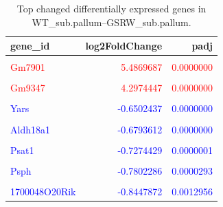 \documentclass[
  letterpaper,
  DIV=11,
  numbers=noendperiod]{scrartcl}
\begin{document}
\hypertarget{tbl-comparison_2}{}
\begin{table}
\caption{\label{tbl-comparison_2}Top changed differentially expressed genes in
WT\_sub.pallum--GSRW\_sub.pallum. }\tabularnewline

\centering\begingroup\fontsize{8}{10}\selectfont

\begin{tabular}[t]{lrr}
\toprule
gene\_id & log2FoldChange & padj\\
\midrule
\textcolor{red}{\cellcolor{gray!6}{AC135641.1}} & \textcolor{red}{\cellcolor{gray!6}{5.9024901}} & \textcolor{red}{\cellcolor{gray!6}{0.0300606}}\\
\textcolor{red}{Gm7901} & \textcolor{red}{5.4869687} & \textcolor{red}{0.0000000}\\
\textcolor{red}{\cellcolor{gray!6}{C030018K13Rik}} & \textcolor{red}{\cellcolor{gray!6}{5.1745342}} & \textcolor{red}{\cellcolor{gray!6}{0.0371569}}\\
\textcolor{red}{Gm9347} & \textcolor{red}{4.2974447} & \textcolor{red}{0.0000000}\\
\textcolor{red}{\cellcolor{gray!6}{Cxcl14}} & \textcolor{red}{\cellcolor{gray!6}{0.7804630}} & \textcolor{red}{\cellcolor{gray!6}{0.0352495}}\\
\addlinespace
\textcolor{blue}{Yars} & \textcolor{blue}{-0.6502437} & \textcolor{blue}{0.0000000}\\
\textcolor{blue}{\cellcolor{gray!6}{Mars}} & \textcolor{blue}{\cellcolor{gray!6}{-0.6584464}} & \textcolor{blue}{\cellcolor{gray!6}{0.0000000}}\\
\textcolor{blue}{Aldh18a1} & \textcolor{blue}{-0.6793612} & \textcolor{blue}{0.0000000}\\
\textcolor{blue}{\cellcolor{gray!6}{Phgdh}} & \textcolor{blue}{\cellcolor{gray!6}{-0.6999350}} & \textcolor{blue}{\cellcolor{gray!6}{0.0000001}}\\
\textcolor{blue}{Psat1} & \textcolor{blue}{-0.7274429} & \textcolor{blue}{0.0000001}\\
\addlinespace
\textcolor{blue}{\cellcolor{gray!6}{Gmnc}} & \textcolor{blue}{\cellcolor{gray!6}{-0.7695529}} & \textcolor{blue}{\cellcolor{gray!6}{0.0208708}}\\
\textcolor{blue}{Psph} & \textcolor{blue}{-0.7802286} & \textcolor{blue}{0.0000293}\\
\textcolor{blue}{\cellcolor{gray!6}{Ddit3}} & \textcolor{blue}{\cellcolor{gray!6}{-0.7898461}} & \textcolor{blue}{\cellcolor{gray!6}{0.0000182}}\\
\textcolor{blue}{1700048O20Rik} & \textcolor{blue}{-0.8447872} & \textcolor{blue}{0.0012956}\\

\end{tabular}
\end{table}
\end{document}
